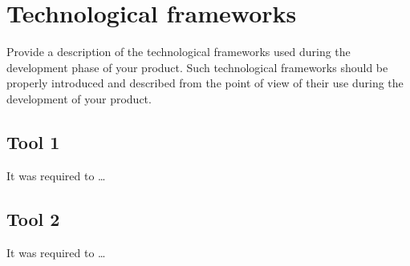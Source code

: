 \chapter{Technological frameworks}
\label{chap:techFrm}


Provide a description of the technological frameworks used during the
development phase of your product. Such technological frameworks
should be properly introduced and described from the point of view of their
use during the development of your product.



\section{Tool 1}
\label{sec:Tool1}
It was required to \ldots


\section{Tool 2}
\label{sec:GUIDev}
It was required to \ldots



